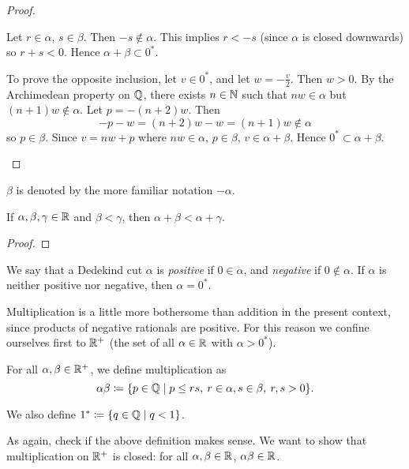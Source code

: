 \begin{proof}
\begin{enumerate}[label=(\roman*)]
Let $r\in\alpha$, $s\in\beta$. Then $-s\notin\alpha$. This implies $r<-s$ (since $\alpha$ is closed downwards) so $r+s<0$. Hence $\alpha+\beta\subset0^*$.

To prove the opposite inclusion, let $v\in0^*$, and let $w=-\frac{v}{2}$. Then $w>0$. By the Archimedean property on $\mathbb Q$, there exists $n\in\mathbb N$ such that $nw\in\alpha$ but $(n+1)w\notin\alpha$. Let $p=-(n+2)w$. Then
\[-p-w=(n+2)w-w=(n+1)w\notin\alpha\]
so $p\in\beta$. Since $v=nw+p$ where $nw\in\alpha$, $p\in\beta$, $v\in\alpha+\beta$. Hence $0^*\subset\alpha+\beta$.
\end{enumerate}
\end{proof}

\begin{notation}
$\beta$ is denoted by the more familiar notation $-\alpha$.
\end{notation}

\begin{proposition}
If $\alpha,\beta,\gamma\in\mathbb R$ and $\beta<\gamma$, then $\alpha+\beta<\alpha+\gamma$.
\end{proposition}

\begin{proof}

\end{proof}

We say that a Dedekind cut $\alpha$ is \emph{positive} if $0\in\alpha$, and \emph{negative} if $0\notin\alpha$. If $\alpha$ is neither positive nor negative, then $\alpha=0^*$.

Multiplication is a little more bothersome than addition in the present context, since products of negative rationals are positive. For this reason we confine ourselves first to $\mathbb R^+$ (the set of all $\alpha\in\mathbb R$ with $\alpha>0^*$).

\begin{definition}
For all $\alpha,\beta\in\mathbb R^+$, we define multiplication as
\[\alpha\beta\coloneqq\{p\in\mathbb Q\mid p\le rs,\:r\in\alpha,s\in\beta,\:r,s>0\}.\]
\end{definition}

We also define $1^*\coloneqq\{q\in\mathbb Q\mid q<1\}$.

As again, check if the above definition makes sense. We want to show that multiplication on $\mathbb R^+$ is closed: for all $\alpha,\beta\in\mathbb R$, $\alpha\beta\in\mathbb R$.

